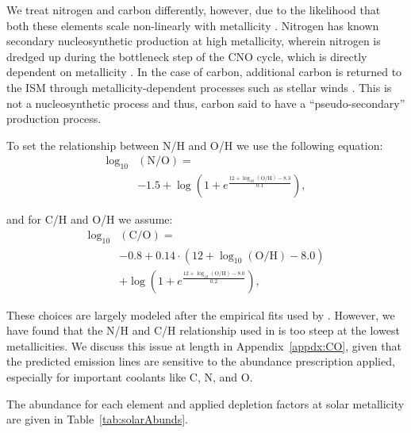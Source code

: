 \documentclass[preprint2,trackchanges]{aastex62}
\begin{document}
We treat nitrogen and carbon differently, however, due to the likelihood that both these elements scale non-linearly with metallicity \citep[e.g.,][]{VilaCostas+1993, Henry+2000, Berg+2016}. Nitrogen has known secondary nucleosynthetic production at high metallicity, wherein nitrogen is dredged up during the bottleneck step of the CNO cycle, which is directly dependent on metallicity \citep{Cowley+1995}. In the case of carbon, additional carbon is returned to the ISM through metallicity-dependent processes such as stellar winds \citep{Garnett+1999}. This is not a nucleosynthetic process and thus, carbon said to have a ``pseudo-secondary'' production process.

To set the relationship between N/H and O/H we use the following equation:
\begin{equation}\label{eq:nitrogen}
\begin{aligned}
    \log_{10}&(\mathrm{N}/\mathrm{O}) = \\
    & -1.5 + \log\left( 1 + e^{\frac{12 + \log_{10}(\mathrm{O}/\mathrm{H})-8.3}{0.1}}\right),
\end{aligned}
\end{equation}

and for C/H and O/H we assume:
\begin{equation}\label{eq:carbon}
\begin{aligned}
    \log_{10}&(\mathrm{C}/\mathrm{O}) = \\
    & -0.8 + 0.14\cdot\left(12 + \log_{10}(\mathrm{O}/\mathrm{H})-8.0\right) \\
    & + \log\left( 1 + e^{\frac{12 + \log_{10}(\mathrm{O}/\mathrm{H})-8.0}{0.2}}\right),
\end{aligned}
\end{equation}

These choices are largely modeled after the empirical fits used by \citet{Dopita+2013}. However, we have found that the N/H and C/H relationship used in \citet{Dopita+2013} is too steep at the lowest metallicities. We discuss this issue at length in Appendix~\ref{appdx:CO}, given that the predicted emission lines are sensitive to the abundance prescription applied, especially for important coolants like C, N, and O.

The abundance for each element and applied depletion factors at solar metallicity are given in Table~\ref{tab:solarAbunds}.
\end{document}
